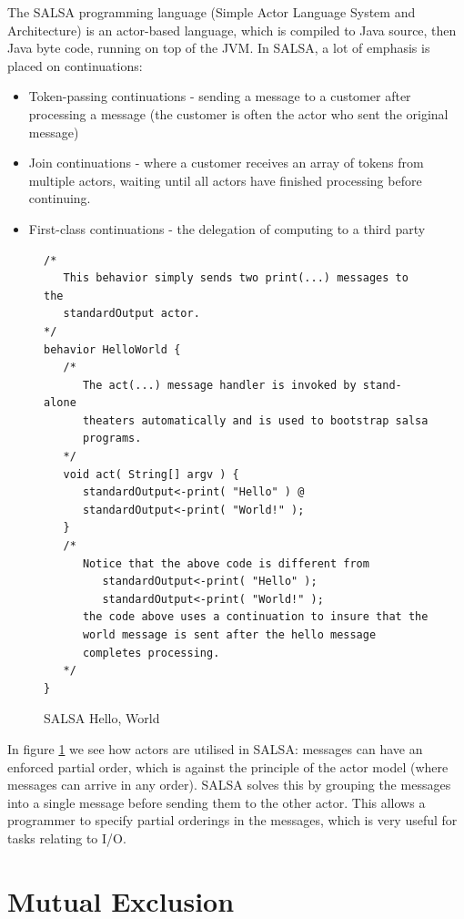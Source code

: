 \documentclass[11pt,a4paper]{report}
\begin{document}
The SALSA programming language (Simple Actor Language System and Architecture) is an actor-based language, which is compiled to Java source, then Java byte code, running on top of the JVM.
In SALSA, a lot of emphasis is placed on continuations:
\begin{itemize}[noitemsep]
	\item Token-passing continuations - sending a message to a customer after processing a message (the customer is often the actor who sent the original message)
	\item Join continuations - where a customer receives an array of tokens from multiple actors, waiting until all actors have finished processing before continuing.
	\item First-class continuations - the delegation of computing to a third party\cite{salsa-continuations}
\end{itemize}

\begin{figure}[H]
\begin{verbatim}
/*
   This behavior simply sends two print(...) messages to the
   standardOutput actor.
*/
behavior HelloWorld {
   /*
      The act(...) message handler is invoked by stand-alone
      theaters automatically and is used to bootstrap salsa
      programs.
   */
   void act( String[] argv ) {
      standardOutput<-print( "Hello" ) @
      standardOutput<-print( "World!" );
   }
   /*
      Notice that the above code is different from
         standardOutput<-print( "Hello" );
         standardOutput<-print( "World!" );
      the code above uses a continuation to insure that the
      world message is sent after the hello message
      completes processing.
   */
}
\end{verbatim}
\caption{SALSA Hello, World\cite{salsa-example}}
\label{fig:salsa-helloworld}
\end{figure}

In figure \ref{fig:salsa-helloworld} we see how actors are utilised in SALSA: messages can have an enforced partial order, which is against the principle of the actor model (where messages can arrive in any order).
SALSA solves this by grouping the messages into a single message before sending them to the other actor.
This allows a programmer to specify partial orderings in the messages, which is very useful for tasks relating to I/O.

\newpage
\section{Mutual Exclusion}
\end{document}
